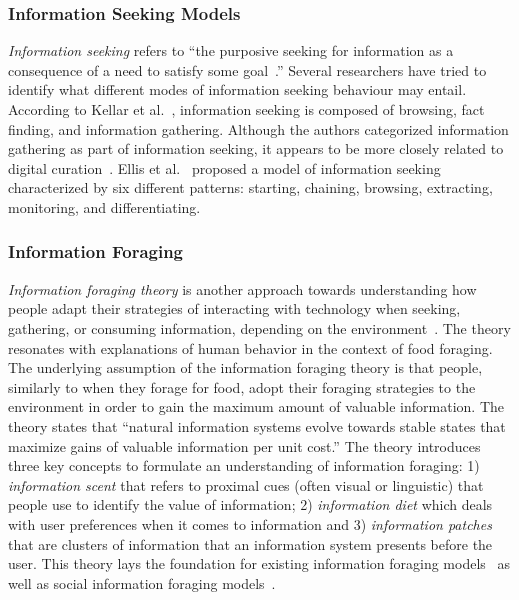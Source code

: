 \documentclass[review]{elsarticle}
\begin{document}
\subsubsection{Information Seeking Models}
\textit{Information seeking} refers to ``the purposive seeking for information as a consequence of a need to satisfy some goal~\cite{wilson2000human}.'' Several researchers have tried to identify what different modes of information seeking behaviour may entail. According to Kellar et al.~\cite{kellar2006goal}, information seeking is composed of browsing, fact finding, and information gathering. Although the authors categorized information gathering as part of information seeking, it appears to be more closely related to digital curation~\cite{beagrie2008digital,whittaker2011personal}. 
Ellis et al.~\cite{ellis1989behavioural,ellis1993comparison,ellis1997modelling} proposed a model of information seeking characterized by six different patterns: starting, chaining, browsing, extracting, monitoring, and differentiating. 

\subsubsection{Information Foraging}
\textit{Information foraging theory} is another approach towards understanding how people adapt their strategies of interacting with technology when seeking, gathering, or consuming information, depending on the environment~\cite{pirolli1999information}. The theory resonates with explanations of human behavior in the context of food foraging. The underlying assumption of the information foraging theory is that people, similarly to when they forage for food, adopt their foraging strategies to the environment in order to gain the maximum amount of valuable information. The theory states that ``natural information systems evolve towards stable states that maximize gains of valuable information per unit cost.''
%
The theory introduces three key concepts to formulate an understanding of information foraging: 
1) \textit{information scent} that refers to proximal cues (often visual or linguistic) that people use to identify the value of information; 2) \textit{information diet} which deals with user preferences when it comes to information and 3) \textit{information patches} that are clusters of information that an information system presents before the user. This theory lays the foundation for existing information foraging models~\cite{fu2007snif,kitajima2000comprehension} as well as social information foraging models~\cite{pirolli2009elementary,fu2008microstructures}.  
\end{document}
